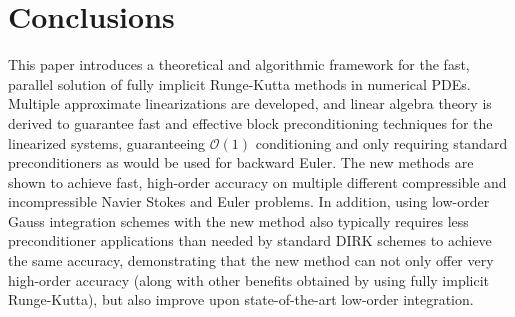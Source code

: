 \documentclass[review]{siamart}
\begin{document}
\section{Conclusions}\label{sec:conc}

This paper introduces a theoretical and algorithmic framework for the fast, parallel
solution of fully implicit Runge-Kutta methods in numerical PDEs. Multiple approximate
linearizations are developed, and linear algebra theory is derived to guarantee
fast and effective block preconditioning techniques for the linearized systems,
guaranteeing $\mathcal{O}(1)$ conditioning and only requiring standard preconditioners
as would be used for backward Euler. The new methods are shown to achieve fast,
high-order accuracy on multiple different compressible and incompressible Navier
Stokes and Euler problems. In addition, using low-order Gauss integration schemes
with the new method also typically requires less preconditioner applications than
needed by standard DIRK schemes to achieve the same accuracy, demonstrating that
the new method can not only offer very high-order accuracy (along with other benefits
obtained by using fully implicit Runge-Kutta), but also improve upon state-of-the-art
low-order integration.



\end{document}
